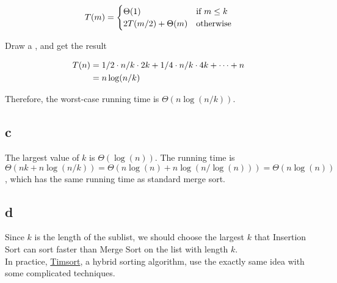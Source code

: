 \begin{equation}\notag
T(m) = \begin{cases}
\Theta(1) & \mbox{if } m \leq k \\
2T(m/2) + \Theta(m) & \mbox{otherwise}
\end{cases}
\end{equation}

Draw a , and get the result

\begin{equation}\notag
\begin{aligned}
T(n) &= 1/2 \cdot n/k \cdot 2k + 1/4 \cdot n/k \cdot 4k + \cdots + n\\
&= n\log(n/k)
\end{aligned}
\end{equation}

Therefore, the worst-case running time is $\Theta(n\log(n/k))$.


\subsection{c}

The largest value of $k$ is $\Theta(\log(n))$.
The running time is $\Theta(nk + n\log(n/k)) = \Theta(n\log(n) + n\log(n/\log(n))) = \Theta(n\log(n))$, which has the same running time as standard merge sort. 


\subsection{d}

Since $k$ is the length of the sublist, we should choose the largest $k$ that Insertion Sort can sort faster than Merge Sort on the list with length $k$.\\

In practice, \href{http://en.wikipedia.org/wiki/Timsort}{Timsort}, a hybrid sorting algorithm, use the exactly same idea with some complicated techniques.
